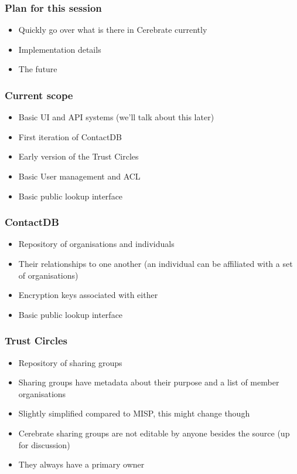 
\begin{frame}[t,plain]
\titlepage
\end{frame}

\begin{frame}
	\frametitle{Plan for this session}
	\begin{itemize}
		\item Quickly go over what is there in Cerebrate currently
                \item Implementation details
                \item The future
	\end{itemize}
\end{frame}

\begin{frame}
	\frametitle{Current scope}
	\begin{itemize}
                \item Basic UI and API systems (we'll talk about this later)
                \item First iteration of ContactDB
                \item Early version of the Trust Circles
                \item Basic User management and ACL
                \item Basic public lookup interface
	\end{itemize}
\end{frame}

\begin{frame}
	\frametitle{ContactDB}
	\begin{itemize}
		\item Repository of organisations and individuals
                \item Their relationships to one another (an individual can be affiliated with a set of organisations)
                \item Encryption keys associated with either
                \item Basic public lookup interface
	\end{itemize}
\end{frame}

\begin{frame}
	\frametitle{Trust Circles}
	\begin{itemize}
		\item Repository of sharing groups
                \item Sharing groups have metadata about their purpose and a list of member organisations
                \item Slightly simplified compared to MISP, this might change though
                \item Cerebrate sharing groups are not editable by anyone besides the source (up for discussion)
                \item They always have a primary owner
	\end{itemize}
\end{frame}


